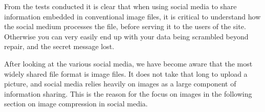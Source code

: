 From the tests conducted it is clear that when using social media to share information embedded in conventional image files, it is critical to understand how the social medium processes the file, before serving it to the users of the site.
Otherwise you can very easily end up with your data being scrambled beyond repair, and the secret message lost.\vspace*{12pt}

\noindent After looking at the various social media, we have become aware that the most widely shared file format is image files.
It does not take that long to upload a picture, and social media relies heavily on images as a large component of information sharing.
This is the reason for the focus on images in the following section on image compression in social media.
